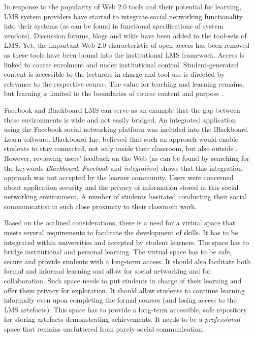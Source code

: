 In response to the popularity of Web 2.0 tools and their potential for learning,
LMS system providers have started to integrate social networking functionality
into their systems (as can be found in functional specifications of system
vendors). Discussion forums, blogs and wikis have been added to the tool-sets of
LMS. Yet, the important Web 2.0 characteristic of open access has been removed
as these tools have been bound into the institutional LMS framework. Access is
linked to course enrolment and under institutional control. Student-generated
content is accessible to the lecturers in charge and tool use is directed by
relevance to the respective course. The value for teaching and learning remains,
but learning is limited to the boundaries of course content and purpose
\citep{Mott2010}.

Facebook and Blackboard LMS can serve as an example that the gap between
these environments is wide and not easily bridged. An integrated application
using the Facebook social networking platform was included into the Blackboard
Learn software. Blackboard Inc. believed that such an approach would enable
students to stay connected, not only inside their classroom, but also outside
\citep{BlackboardInc.2009}. However, reviewing users' feedback on the Web (as
can be found by searching for the keywords \textit{Blackboard},
\textit{Facebook} and \textit{integration}) shows that this integration approach
was not accepted by the learner community. Users were concerned about
application security and the privacy of information stored in this social
networking environment. A number of students hesitated conducting their social
communication in such close proximity to their classroom work. 

Based on the outlined considerations, there is a need for a virtual space that
meets several requirements to facilitate the development of \LLLs skills. It has
to be integrated within universities and accepted by student
learners. The space has to bridge institutional and personal learning. The
virtual space has to be safe, secure and provide students with a long-term
access. It should also facilitate both formal and informal learning and allow
for social networking and for collaboration. Such space needs to put students in
charge of their learning and offer them privacy for exploration. It should allow
students to continue learning informally even upon completing the formal courses
(and losing access to the LMS artefacts). This space has to provide a long-term
accessible, safe repository for storing artefacts demonstrating achievements. It
needs to be a \textit{professional} space that remains uncluttered from purely
social communication.

